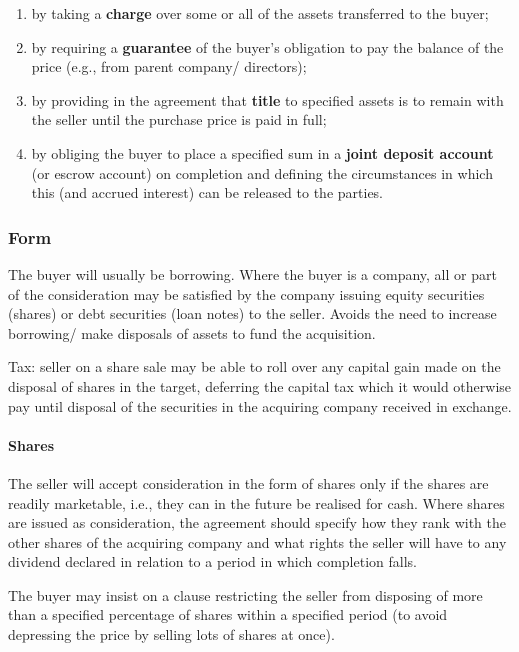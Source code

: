 \documentclass[
]{article}
\providecommand{\tightlist}{%
  \setlength{\itemsep}{0pt}\setlength{\parskip}{0pt}}
\begin{document}
\begin{enumerate}
\def\labelenumi{\arabic{enumi}.}
\tightlist
\item
  by taking a \textbf{charge} over some or all of the assets transferred
  to the buyer;
\item
  by requiring a \textbf{guarantee} of the buyer's obligation to pay the
  balance of the price (e.g., from parent company/ directors);
\item
  by providing in the agreement that \textbf{title} to specified assets
  is to remain with the seller until the purchase price is paid in full;
\item
  by obliging the buyer to place a specified sum in a \textbf{joint
  deposit account} (or escrow account) on completion and defining the
  circumstances in which this (and accrued interest) can be released to
  the parties.
\end{enumerate}

\hypertarget{form}{%
\subsubsection{Form}\label{form}}

The buyer will usually be borrowing. Where the buyer is a company, all
or part of the consideration may be satisfied by the company issuing
equity securities (shares) or debt securities (loan notes) to the
seller. Avoids the need to increase borrowing/ make disposals of assets
to fund the acquisition.

Tax: seller on a share sale may be able to roll over any capital gain
made on the disposal of shares in the target, deferring the capital tax
which it would otherwise pay until disposal of the securities in the
acquiring company received in exchange.

\hypertarget{shares}{%
\paragraph{Shares}\label{shares}}

The seller will accept consideration in the form of shares only if the
shares are readily marketable, i.e., they can in the future be realised
for cash. Where shares are issued as consideration, the agreement should
specify how they rank with the other shares of the acquiring company and
what rights the seller will have to any dividend declared in relation to
a period in which completion falls.

The buyer may insist on a clause restricting the seller from disposing
of more than a specified percentage of shares within a specified period
(to avoid depressing the price by selling lots of shares at once).
\end{document}

